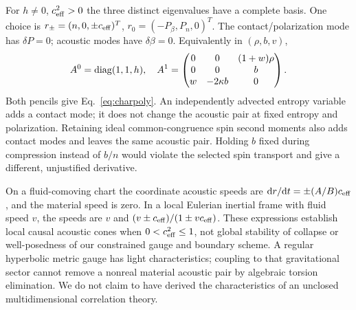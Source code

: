 For $h\ne0$, $c_{\rm eff}^2>0$ the three distinct eigenvalues have a complete basis. One choice is $r_\pm=(n,0,\pm c_{\rm eff})^T$, $r_0=(-P_\beta,P_n,0)^T$. The contact/polarization mode has $\delta P=0$; acoustic modes have $\delta\beta=0$. Equivalently in $(\rho,b,v)$,
\begin{equation}
 A^0=\operatorname{diag}(1,1,h),\quad
 A^1=\begin{pmatrix}0&0&(1+w)\rho\\0&0&b\\w&-2\kappa b&0\end{pmatrix}.
\end{equation}
Both pencils give Eq.~\eqref{eq:charpoly}. An independently advected entropy variable adds a contact mode; it does not change the acoustic pair at fixed entropy and polarization. Retaining ideal common-congruence spin second moments also adds contact modes and leaves the same acoustic pair. Holding $b$ fixed during compression instead of $b/n$ would violate the selected spin transport and give a different, unjustified derivative.

On a fluid-comoving chart the coordinate acoustic speeds are $\mathrm d r/\mathrm d t=\pm(A/B)c_{\rm eff}$, and the material speed is zero. In a local Eulerian inertial frame with fluid speed $v$, the speeds are $v$ and $(v\pm c_{\rm eff})/(1\pm vc_{\rm eff})$. These expressions establish local causal acoustic cones when $0<c_{\rm eff}^2\leq1$, not global stability of collapse or well-posedness of our constrained gauge and boundary scheme. A regular hyperbolic metric gauge has light characteristics; coupling to that gravitational sector cannot remove a nonreal material acoustic pair by algebraic torsion elimination. We do not claim to have derived the characteristics of an unclosed multidimensional correlation theory.

